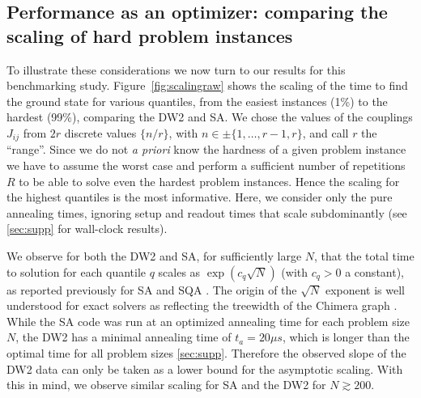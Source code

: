 \subsection{Performance as an optimizer: comparing the scaling of hard problem instances}

To illustrate these considerations we now turn to our results for this benchmarking study. Figure~\ref{fig:scalingraw} shows the scaling of the time to find the ground state for various quantiles, from the easiest instances (1\%) to the hardest (99\%), comparing the DW2 and SA. We chose the values of the couplings $J_{ij}$ from $2r$ discrete values  $\{n/r\}$, with $n \in \pm\{1, \dots, r-1, r\}$, and call $r$ the ``range''. Since we do not \textit{a priori} know the hardness of a given problem instance we have to assume the worst case and perform a sufficient number of repetitions $R$ to be able to solve even the hardest problem instances. Hence the scaling for the highest quantiles is the most informative. Here, we consider only the pure annealing times, ignoring setup and readout times that scale subdominantly (see \ref{sec:supp} for wall-clock results).

We observe for both the DW2 and SA, for sufficiently large $N$, that the total time to solution for each quantile $q$ scales as $\exp(c_q\sqrt{N})$ (with $c_q>0$ a constant), as reported previously for SA and SQA \cite{q108}. The origin of the $\sqrt{N}$ exponent is well understood for exact solvers as reflecting the treewidth of the Chimera graph \cite{SM,Choi2}. While the SA code was run at an optimized annealing time for each problem size $N$, the DW2 has a minimal annealing time of $t_a=20\mu s$, which is longer than the optimal time for all problem sizes \ref{sec:supp}. Therefore the observed slope of the DW2 data can only be taken as a lower bound for the asymptotic scaling. With this in mind, we observe similar scaling for SA and the DW2 for $N\gtrsim 200$.

